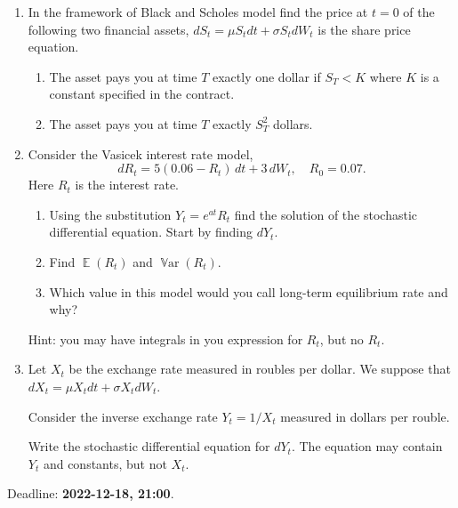 \documentclass[12pt]{article}
\DeclareMathOperator{\Var}{\mathbb{V}ar}
\DeclareMathOperator{\E}{\mathbb{E}}
\begin{document}
\begin{enumerate}
\item In the framework of Black and Scholes model find the price at $t=0$ of the following two 
financial assets, $dS_t = \mu S_t dt + \sigma S_t dW_t$ is the share price equation. 
\begin{enumerate}
  \item The asset pays you at time $T$ exactly one dollar if $S_T < K$ where $K$ is a constant 
  specified in the contract. 
  \item The asset pays you at time $T$ exactly $S_T^2$ dollars.
\end{enumerate}



\item Consider the Vasicek interest rate model, 
\[
  dR_t=5(0.06 - R_t) \, dt + 3 \, dW_t, \quad R_0 = 0.07.
\]
Here $R_t$ is the interest rate.
\begin{enumerate}
\item Using the substitution $Y_t=e^{at} R_t$ find the solution of the stochastic differential equation.
Start by finding $dY_t$. 
\item Find $\E(R_t)$ and $\Var(R_t)$.
\item Which value in this model would you call long-term equilibrium rate and why?
\end{enumerate}

Hint: you may have integrals in you expression for $R_t$, but no $R_t$.

\item Let $X_t$ be the exchange rate measured in roubles per dollar. 
We suppose that $dX_t = \mu X_t dt + \sigma X_t dW_t$. 

Consider the inverse exchange rate $Y_t = 1/X_t$ measured in dollars per rouble. 

Write the stochastic differential equation for $dY_t$. 
The equation may contain $Y_t$ and constants, but not $X_t$.


\end{enumerate}


Deadline: \textbf{2022-12-18, 21:00}. 
\end{document}
